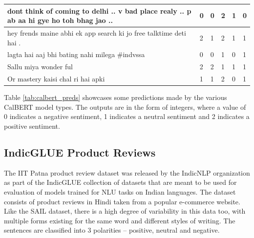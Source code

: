 \documentclass[conference]{IEEEtran}
\begin{document}
\begin{table}[]
\begin{tabular}{|p{}|p{}|p{}|p{}|p{}|p{}|}
dont think of coming to delhi .. v bad place realy .. p ab aa hi gye ho   toh bhag jao ..                                   & 0                    & 0                            & 2                           & 1                        & 0                     \\ \hline
hey frends maine abhi ek app search ki jo free talktime deti hai .                                                          & 2                    & 1                            & 2                           & 1                        & 1                     \\ \hline
lagta hai aaj bhi bating nahi milega \#indvssa                                                                              & 0                    & 0                            & 1                           & 0                        & 1                     \\ \hline
Sallu miya wonder ful                                                                                                       & 2                    & 2                            & 1                           & 1                        & 1                     \\ \hline
Or mastery kaisi chal ri hai apki                                                                                           & 1                    & 1                            & 2                           & 0                        & 1                     \\ \hline
\end{tabular}
\end{table}

Table \ref{tab:calbert_preds} showcases some predictions made by the various CalBERT model types. The outputs are in the form of integers, where a value of 0 indicates a negative sentiment, 1 indicates a neutral sentiment and 2 indicates a positive sentiment. 

\subsection{IndicGLUE Product Reviews}

The IIT Patna product review dataset was released by the IndicNLP organization as part of the IndicGLUE collection of datasets that are meant to be used for evaluation of models trained for NLU tasks on Indian languages. The dataset consists of product reviews in Hindi taken from a popular e-commerce website. Like the SAIL dataset, there is a high degree of variability in this data too, with multiple forms existing for the same word and different styles of writing. The sentences are classified into 3 polarities -- positive, neutral and negative.
\end{document}
